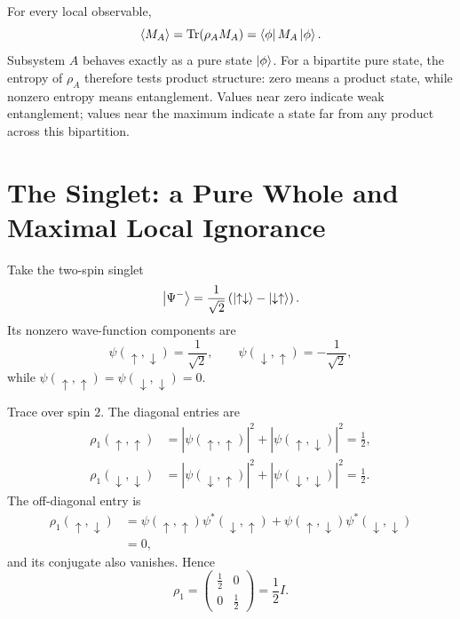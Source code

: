 \begin{classroomqa}
\end{classroomqa}

For every local observable,
\begin{equation}
\left\langle M_A\right\rangle
=\operatorname{Tr}(\rho_A M_A)
=\left\langle\phi\right\rvert M_A\left\lvert\phi\right\rangle.
\end{equation}
Subsystem \(A\) behaves exactly as a pure state \(\left\lvert\phi\right\rangle\). For a bipartite pure state, the entropy of \(\rho_A\) therefore tests product structure: zero means a product state, while nonzero entropy means entanglement. Values near zero indicate weak entanglement; values near the maximum indicate a state far from any product across this bipartition.

\section{The Singlet: a Pure Whole and Maximal Local Ignorance}

Take the two-spin singlet
\begin{equation}
\left\lvert\Psi^-\right\rangle
=\frac{1}{\sqrt{2}}
\left(
\left\lvert\uparrow\downarrow\right\rangle
-\left\lvert\downarrow\uparrow\right\rangle
\right).
\end{equation}
Its nonzero wave-function components are
\begin{equation}
\psi(\uparrow,\downarrow)=\frac{1}{\sqrt{2}},
\qquad
\psi(\downarrow,\uparrow)=-\frac{1}{\sqrt{2}},
\end{equation}
while \(\psi(\uparrow,\uparrow)=\psi(\downarrow,\downarrow)=0\).

Trace over spin \(2\). The diagonal entries are
\begin{align}
\rho_1(\uparrow,\uparrow)
&=|\psi(\uparrow,\uparrow)|^2
 +|\psi(\uparrow,\downarrow)|^2
=\frac{1}{2}, \\
\rho_1(\downarrow,\downarrow)
&=|\psi(\downarrow,\uparrow)|^2
 +|\psi(\downarrow,\downarrow)|^2
=\frac{1}{2}.
\end{align}
The off-diagonal entry is
\begin{align}
\rho_1(\uparrow,\downarrow)
&=\psi(\uparrow,\uparrow)\psi^*(\downarrow,\uparrow)
 +\psi(\uparrow,\downarrow)\psi^*(\downarrow,\downarrow) \\
&=0,
\end{align}
and its conjugate also vanishes. Hence
\begin{equation}
\rho_1
=
\begin{pmatrix}
\frac12&0\\[2pt]
0&\frac12
\end{pmatrix}
=\frac12 I.
\end{equation}

